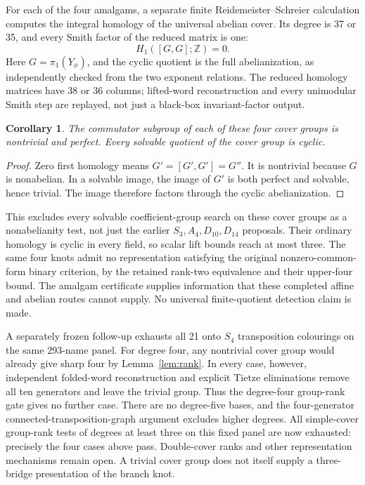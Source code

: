 \documentclass[11pt]{article}
\newtheorem{corollary}[theorem]{Corollary}
\newcommand{\Z}{\mathbb Z}
\begin{document}
For each of the four amalgams, a separate finite
Reidemeister--Schreier calculation computes the integral
homology of the universal abelian cover. Its degree is 37 or
35, and every Smith factor of the reduced matrix is one:
\[
                   H_1([G,G];\Z)=0.
\]
Here $G=\pi_1(Y_\phi)$, and the cyclic quotient is the full
abelianization, as independently checked from the two exponent
relations. The reduced homology matrices have 38 or 36 columns;
lifted-word reconstruction and every unimodular Smith step
are replayed, not just a black-box invariant-factor output.

\begin{corollary}
The commutator subgroup of each of these four cover groups
is nontrivial and perfect. Every solvable quotient of the
cover group is cyclic.
\end{corollary}
\begin{proof}
Zero first homology means $G'=[G',G']=G''$. It is nontrivial
because $G$ is nonabelian. In a solvable image, the image of
$G'$ is both perfect and solvable, hence trivial. The image
therefore factors through the cyclic abelianization.
\end{proof}

This excludes every solvable coefficient-group search on
these cover groups as a nonabelianity test, not just the
earlier $S_3,A_4,D_{10},D_{14}$ proposals. Their ordinary
homology is cyclic in every field, so scalar lift bounds
reach at most three. The same four knots admit no
representation satisfying the original nonzero-common-form
binary criterion, by the retained rank-two equivalence and
their upper-four bound. The amalgam certificate supplies
information that these completed affine and abelian routes
cannot supply. No universal finite-quotient detection claim
is made.

A separately frozen follow-up exhausts all 21 onto $S_4$
transposition colourings on the same 293-name panel. For
degree four, any nontrivial cover group would already give
sharp four by Lemma~\ref{lem:rank}. In every case, however,
independent folded-word reconstruction and explicit Tietze
eliminations remove all ten generators and leave the trivial
group. Thus the degree-four group-rank gate gives no further
case. There are no degree-five bases, and the four-generator
connected-transposition-graph argument excludes higher
degrees. All simple-cover group-rank tests of degrees at
least three on this fixed panel are now exhausted: precisely
the four cases above pass. Double-cover ranks and other
representation mechanisms remain open. A trivial cover
group does not itself supply a three-bridge presentation of
the branch knot.
\end{document}
